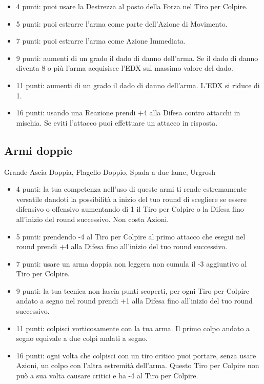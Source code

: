 \begin{multicols}{2}
\begin{itemize}[leftmargin=*] \setlength{\itemsep}{0pt}

\item 4 punti: puoi usare la Destrezza al posto della Forza nel Tiro per Colpire.
\item 5 punti: puoi estrarre l'arma come parte dell'Azione di Movimento.
\item 7 punti: puoi estrarre l'arma come Azione Immediata.
\item 9 punti: aumenti di un grado il dado di danno dell'arma. Se il dado di danno diventa 8 o più l'arma acquisisce l'EDX sul massimo valore del dado.
\item 11 punti: aumenti di un grado il dado di danno dell'arma. L'EDX si riduce di 1.
\item 16 punti: usando una Reazione prendi +4 alla Difesa contro attacchi in mischia. Se eviti l'attacco puoi effettuare un attacco in risposta.

\end{itemize}

\subsection{Armi doppie}  Grande Ascia Doppia, Flagello Doppio, Spada a due lame, Urgrosh\label{listaarmidoppie}

\begin{itemize}[leftmargin=*] \setlength{\itemsep}{0pt}
\item 4 punti: la tua competenza nell'uso di queste armi ti rende estremamente versatile dandoti la possibilità a inizio del tuo round di scegliere se essere difensivo o offensivo aumentando di 1 il Tiro per Colpire o la Difesa fino all'inizio del round successivo. Non costa Azioni.
\item 5 punti: prendendo -4 al Tiro per Colpire al primo attacco che esegui nel round prendi +4 alla Difesa fino all'inizio del tuo round successivo.
\item 7 punti: usare un arma doppia non leggera non cumula il -3 aggiuntivo al Tiro per Colpire.
\item 9 punti: la tua tecnica non lascia punti scoperti, per ogni Tiro per Colpire andato a segno nel round prendi +1 alla Difesa fino all'inizio del tuo round successivo.
\item 11 punti: colpisci vorticosamente con la tua arma. Il primo colpo andato a segno equivale a due colpi andati a segno.
\item 16 punti: ogni volta che colpisci con un tiro critico puoi portare, senza usare Azioni, un colpo con l'altra estremità dell'arma. Questo Tiro per Colpire non può a sua volta causare critici e ha -4 al Tiro per Colpire.


\end{itemize}
\end{multicols}
